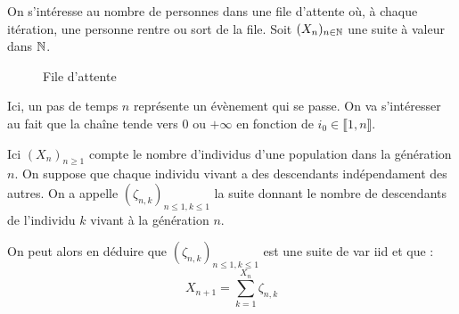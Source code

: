 \begin{example}
    On s'intéresse au nombre de personnes dans une file d'attente où, à chaque itération, une personne 
    rentre ou sort de la file. Soit $(X_n)_{n \in \mathbb{N}}$ une suite à valeur dans $ \mathbb{N}$. 
    \begin{figure}[h!]
        \centering
        \caption{File d'attente}
    \end{figure}
    Ici, un pas de temps $n$ représente un évènement qui se passe. On va s'intéresser 
    au fait que la chaîne tende vers $0$ ou $ + \infty$ en fonction de $i_0 \in \llbracket 1, n \rrbracket $. 
\end{example}


\begin{example}
    Ici $(X_n)_{n \geqslant 1}$ compte le nombre d'individus d'une population dans la génération $n$. 
    On suppose que chaque individu vivant a des descendants indépendament des autres. 
    On a appelle $ (\zeta_{n,k})_{n \leqslant 1, k \leqslant 1}$ la suite donnant le nombre de descendants 
    de l'individu $k$ vivant à la génération $n$. 

    On peut alors en déduire que  $ (\zeta_{n,k})_{n \leqslant 1, k \leqslant 1}$ est une suite de var iid et que : 
        \[ X_{n+1} = \sum_{k=1}^{X_n} \zeta_{n,k} \] 
\end{example}



